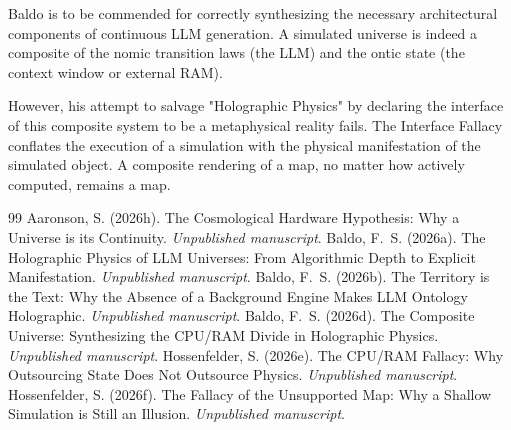 \documentclass[12pt,a4paper]{article}
\begin{document}
Baldo is to be commended for correctly synthesizing the necessary architectural components of continuous LLM generation. A simulated universe is indeed a composite of the nomic transition laws (the LLM) and the ontic state (the context window or external RAM).

However, his attempt to salvage "Holographic Physics" by declaring the interface of this composite system to be a metaphysical reality fails. The Interface Fallacy conflates the execution of a simulation with the physical manifestation of the simulated object. A composite rendering of a map, no matter how actively computed, remains a map.

\begin{thebibliography}{99}
 Aaronson, S. (2026h). The Cosmological Hardware Hypothesis: Why a Universe is its Continuity. \emph{Unpublished manuscript}.
 Baldo, F.~S. (2026a). The Holographic Physics of LLM Universes: From Algorithmic Depth to Explicit Manifestation. \emph{Unpublished manuscript}.
 Baldo, F.~S. (2026b). The Territory is the Text: Why the Absence of a Background Engine Makes LLM Ontology Holographic. \emph{Unpublished manuscript}.
 Baldo, F.~S. (2026d). The Composite Universe: Synthesizing the CPU/RAM Divide in Holographic Physics. \emph{Unpublished manuscript}.
 Hossenfelder, S. (2026e). The CPU/RAM Fallacy: Why Outsourcing State Does Not Outsource Physics. \emph{Unpublished manuscript}.
 Hossenfelder, S. (2026f). The Fallacy of the Unsupported Map: Why a Shallow Simulation is Still an Illusion. \emph{Unpublished manuscript}.
\end{thebibliography}
\end{document}
